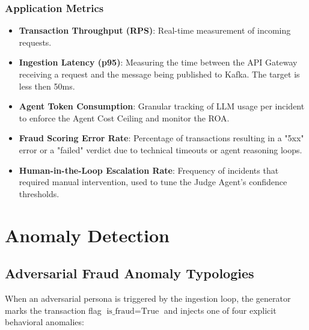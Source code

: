 \documentclass[12pt]{report}
\begin{document}
\subsection{Application Metrics}
\begin{itemize}
    \item \textbf{Transaction Throughput (RPS)}: Real-time measurement of incoming requests.
    \item \textbf{Ingestion Latency (p95)}: Measuring the time between the API Gateway receiving a request and the message being published to Kafka. The target is less then 50ms.
    \item \textbf{Agent Token Consumption}: Granular tracking of LLM usage per incident to enforce the Agent Cost Ceiling and monitor the ROA.
    \item \textbf{Fraud Scoring Error Rate}: Percentage of transactions resulting in a "5xx" error or a "failed" verdict due to technical timeouts or agent reasoning loops.
    \item \textbf{Human-in-the-Loop Escalation Rate}: Frequency of incidents that required manual intervention, used to tune the Judge Agent's confidence thresholds.
\end{itemize}

\chapter{Anomaly Detection}
\section{Adversarial Fraud Anomaly Typologies}
When an adversarial persona is triggered by the ingestion loop, the generator marks the transaction flag $\text{is\_fraud} = \text{True}$ and injects one of four explicit behavioral anomalies:
\end{document}
